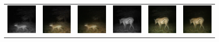 \begin{figure}[htp!]
\begin{tabularx}{\textwidth}{Y Y Y !{\space} Y Y Y}
        \includegraphics{gfx/diffusion-sampling-loss-guided-vs-correction-guided-qual/nir_S2_B06_R1_PICT0128.jpg} & \includegraphics{gfx/diffusion-sampling-loss-guided-vs-correction-guided-qual/diffusion-correction-guided_S2_B06_R1_PICT0128.png} & \includegraphics{gfx/diffusion-sampling-loss-guided-vs-correction-guided-qual/diffusion-loss-guided_S2_B06_R1_PICT0128.png} & \includegraphics{gfx/diffusion-sampling-loss-guided-vs-correction-guided-qual/nir_S2_B06_R1_PICT0279.jpg} & \includegraphics{gfx/diffusion-sampling-loss-guided-vs-correction-guided-qual/diffusion-correction-guided_S2_B06_R1_PICT0279.png} & \includegraphics{gfx/diffusion-sampling-loss-guided-vs-correction-guided-qual/diffusion-loss-guided_S2_B06_R1_PICT0279.png} \\

\end{tabularx}
\end{figure}
